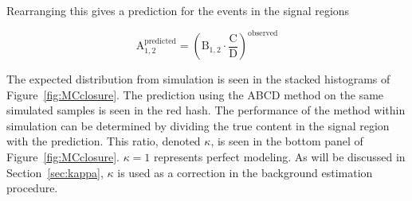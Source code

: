 Rearranging this gives a prediction for the events in the signal regions

\begin{equation}
\mathrm{A}_{1, 2}^{\mathrm{predicted}} = \left( \mathrm{B}_{1, 2} \cdot \frac{\mathrm{C}}{\mathrm{D}}\right)^{\mathrm{observed}}
\end{equation}

The expected \ptmiss distribution from simulation is seen in the stacked histograms of Figure~\ref{fig:MCclosure}. The prediction using the ABCD method on the same simulated samples is seen in the red hash. The performance of the method within simulation can be determined by dividing the true content in the signal region with the prediction. This ratio, denoted $\kappa$, is seen in the bottom panel of Figure~\ref{fig:MCclosure}. $\kappa=1$ represents perfect modeling. As will be discussed in Section~\ref{sec:kappa}, $\kappa$ is used as a correction in the background estimation procedure.


